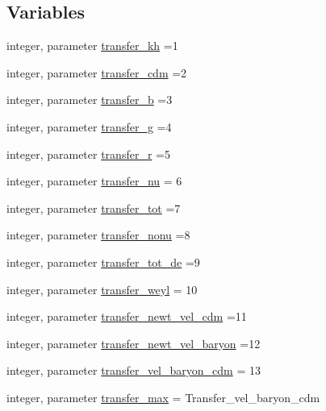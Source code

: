 \subsection*{Variables}
\begin{DoxyCompactItemize}
\item 
integer, parameter \mbox{\hyperlink{namespacetransfer_a53e222aefb0911649bf35fc879a5f367}{transfer\+\_\+kh}} =1
\item 
integer, parameter \mbox{\hyperlink{namespacetransfer_a9e67898263c714e994816a119937416f}{transfer\+\_\+cdm}} =2
\item 
integer, parameter \mbox{\hyperlink{namespacetransfer_ab15ebb6605b445eaddd657e94abc151b}{transfer\+\_\+b}} =3
\item 
integer, parameter \mbox{\hyperlink{namespacetransfer_a4076f4ea08670377ed92c3a16ced89f0}{transfer\+\_\+g}} =4
\item 
integer, parameter \mbox{\hyperlink{namespacetransfer_a55264fe59289090c8c796b22c71d5937}{transfer\+\_\+r}} =5
\item 
integer, parameter \mbox{\hyperlink{namespacetransfer_a88f1f472755284c745f4f9627f3385f3}{transfer\+\_\+nu}} = 6
\item 
integer, parameter \mbox{\hyperlink{namespacetransfer_a96bc38e4fa7d41872d481db49a3e5f46}{transfer\+\_\+tot}} =7
\item 
integer, parameter \mbox{\hyperlink{namespacetransfer_aa028f75ae9a421f87ff8e2ebbfb88e73}{transfer\+\_\+nonu}} =8
\item 
integer, parameter \mbox{\hyperlink{namespacetransfer_a3ae9f7a69bc80c029fe96b8a1de263b3}{transfer\+\_\+tot\+\_\+de}} =9
\item 
integer, parameter \mbox{\hyperlink{namespacetransfer_adc4f1fee4e89ed92a0865f3854118eca}{transfer\+\_\+weyl}} = 10
\item 
integer, parameter \mbox{\hyperlink{namespacetransfer_acac3c3e5a8b36cd08ca97ca40bd92fcc}{transfer\+\_\+newt\+\_\+vel\+\_\+cdm}} =11
\item 
integer, parameter \mbox{\hyperlink{namespacetransfer_acfa190894a4b625fe771219f23b9bc2f}{transfer\+\_\+newt\+\_\+vel\+\_\+baryon}} =12
\item 
integer, parameter \mbox{\hyperlink{namespacetransfer_a355c8bcd1bf73a87d603cd7f77c702d0}{transfer\+\_\+vel\+\_\+baryon\+\_\+cdm}} = 13
\item 
integer, parameter \mbox{\hyperlink{namespacetransfer_ac87f6542d01968f20465ccd32f02667c}{transfer\+\_\+max}} = Transfer\+\_\+vel\+\_\+baryon\+\_\+cdm
\item 

\end{DoxyCompactItemize}
